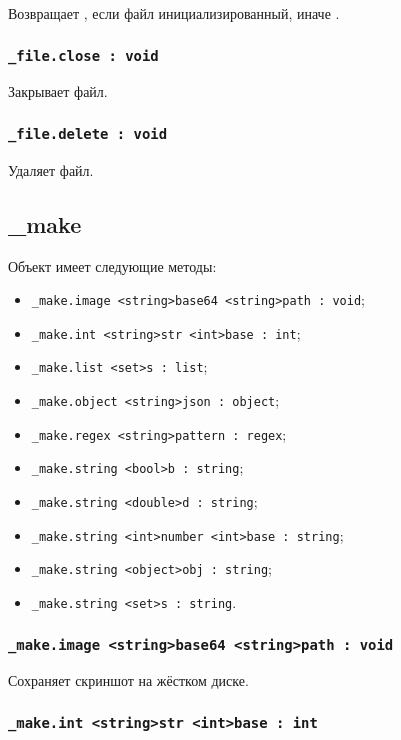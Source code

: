 \documentclass[a4paper, 14pt]{extarticle}
\newenvironment{icItems}
	{ \begin{itemize} [noitemsep,nolistsep] }
	{ \end{itemize} }
\begin{document}
Возвращает \true, если файл инициализированный, иначе \false.

\subsubsection{\lstinline|_file.close : void|}

Закрывает файл.

\subsubsection{\lstinline|_file.delete : void|}

Удаляет файл.

\subsection{{\color{orange} \_make}}

Объект \make{} имеет следующие методы:
\begin{icItems}
	\item \lstinline|_make.image <string>base64 <string>path : void|;
	\item \lstinline|_make.int <string>str <int>base : int|;
	\item \lstinline|_make.list <set>s : list|;
	\item \lstinline|_make.object <string>json : object|;
	\item \lstinline|_make.regex <string>pattern : regex|;
	\item \lstinline|_make.string <bool>b : string|;
	\item \lstinline|_make.string <double>d : string|;
	\item \lstinline|_make.string <int>number <int>base : string|;
	\item \lstinline|_make.string <object>obj : string|;
	\item \lstinline|_make.string <set>s : string|.
\end{icItems}

\subsubsection{\lstinline|_make.image <string>base64 <string>path : void|}

Сохраняет скриншот на жёстком диске.

\subsubsection{\lstinline|_make.int <string>str <int>base : int|}
\end{document}

